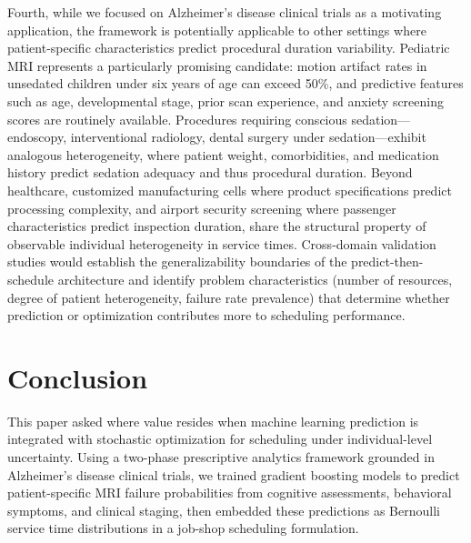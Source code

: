 \documentclass[11pt,a4paper]{article}
\begin{document}
Fourth, while we focused on Alzheimer's disease clinical trials as a motivating application, the framework is potentially applicable to other settings where patient-specific characteristics predict procedural duration variability. Pediatric MRI represents a particularly promising candidate: motion artifact rates in unsedated children under six years of age can exceed 50\%, and predictive features such as age, developmental stage, prior scan experience, and anxiety screening scores are routinely available. Procedures requiring conscious sedation---endoscopy, interventional radiology, dental surgery under sedation---exhibit analogous heterogeneity, where patient weight, comorbidities, and medication history predict sedation adequacy and thus procedural duration. Beyond healthcare, customized manufacturing cells where product specifications predict processing complexity, and airport security screening where passenger characteristics predict inspection duration, share the structural property of observable individual heterogeneity in service times. Cross-domain validation studies would establish the generalizability boundaries of the predict-then-schedule architecture and identify problem characteristics (number of resources, degree of patient heterogeneity, failure rate prevalence) that determine whether prediction or optimization contributes more to scheduling performance.



\section{Conclusion}
\label{sec:conclusion}

This paper asked where value resides when machine learning prediction is integrated with stochastic optimization for scheduling under individual-level uncertainty. Using a two-phase prescriptive analytics framework grounded in Alzheimer's disease clinical trials, we trained gradient boosting models to predict patient-specific MRI failure probabilities from cognitive assessments, behavioral symptoms, and clinical staging, then embedded these predictions as Bernoulli service time distributions in a job-shop scheduling formulation.
\end{document}
